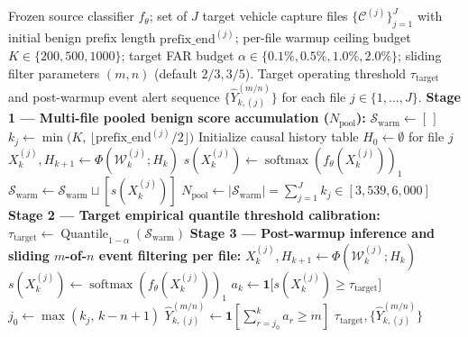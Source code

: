 \documentclass[12pt, a4paper, reqno, oneside]{book}
\begin{document}
\begin{algorithm}[htbp]
\caption{Offline pooled benign prefix calibration ($N_{\mathrm{pool}}$) and sliding $m$-of-$n$ event filtering}\label{alg:benign-cal-mofn}
{\small\linespread{1.05}\selectfont
\begin{algorithmic}[1]
\Require Frozen source classifier $f_\theta$; set of $J$ target vehicle capture files $\{\mathcal{C}^{(j)}\}_{j=1}^J$ with initial benign prefix length $\mathrm{prefix\_end}^{(j)}$; per-file warmup ceiling budget $K \in \{200, 500, 1000\}$; target FAR budget $\alpha \in \{0.1\%, 0.5\%, 1.0\%, 2.0\%\}$; sliding filter parameters $(m, n)$ (default $2/3, 3/5$).
\Ensure Target operating threshold $\tau_{\mathrm{target}}$ and post-warmup event alert sequence $\{\widehat{Y}_{k, (j)}^{(m/n)}\}$ for each file $j \in \{1, \ldots, J\}$.
\State \textbf{Stage 1 --- Multi-file pooled benign score accumulation ($N_{\mathrm{pool}}$):}
\State $\mathcal{S}_{\mathrm{warm}} \leftarrow [\,]$ 
    \State $k_j \leftarrow \min\big(K,\, \lfloor \mathrm{prefix\_end}^{(j)} / 2 \rfloor\big)$ 
    \State Initialize causal history table $H_0 \leftarrow \emptyset$ for file $j$
        \State $X_k^{(j)}, H_{k+1} \leftarrow \Phi(\mathcal{W}_k^{(j)}; H_k)$ 
        \State $s(X_k^{(j)}) \leftarrow \operatorname{softmax}(f_\theta(X_k^{(j)}))_1$ 
        \State $\mathcal{S}_{\mathrm{warm}} \leftarrow \mathcal{S}_{\mathrm{warm}} \sqcup [s(X_k^{(j)})]$
    \EndFor
\EndFor
\State $N_{\mathrm{pool}} \leftarrow |\mathcal{S}_{\mathrm{warm}}| = \sum_{j=1}^J k_j \in [3{,}539, 6{,}000]$ 
\State \textbf{Stage 2 --- Target empirical quantile threshold calibration:}
\State $\tau_{\mathrm{target}} \leftarrow \operatorname{Quantile}_{1-\alpha}(\mathcal{S}_{\mathrm{warm}})$ 
\State \textbf{Stage 3 --- Post-warmup inference and sliding $m$-of-$n$ event filtering per file:}
        \State $X_k^{(j)}, H_{k+1} \leftarrow \Phi(\mathcal{W}_k^{(j)}; H_k)$
        \State $s(X_k^{(j)}) \leftarrow \operatorname{softmax}(f_\theta(X_k^{(j)}))_1$
        \State $a_k \leftarrow \mathbf{1}\big[s(X_k^{(j)}) \ge \tau_{\mathrm{target}}\big]$ 
        \State $j_0 \leftarrow \max(k_j,\, k - n + 1)$
        \State $\widehat{Y}_{k, (j)}^{(m/n)} \leftarrow \mathbf{1}\left[\sum_{r=j_0}^{k} a_r \ge m\right]$ 
    \EndFor
\EndFor
\State \Return $\tau_{\mathrm{target}}, \{\widehat{Y}_{k, (j)}^{(m/n)}\}$
\end{algorithmic}}
\end{algorithm}
\end{document}
